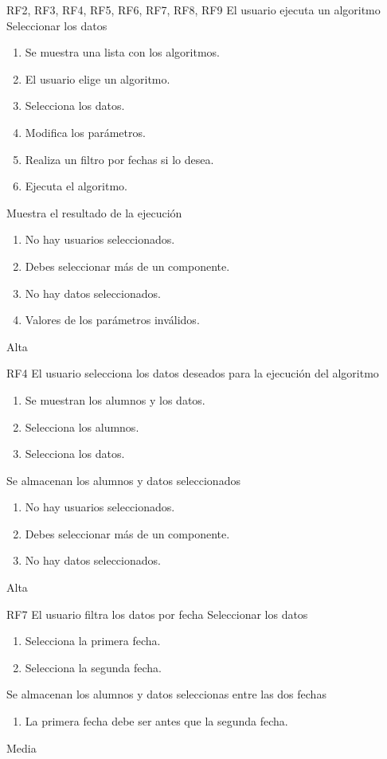 {RF2, RF3, RF4, RF5, RF6, RF7, RF8, RF9}
{El usuario ejecuta un algoritmo}
{Seleccionar los datos}
{
    \begin{enumerate}
        \def\labelenumi{\arabic{enumi}.}
        \tightlist
        \item Se muestra una lista con los algoritmos.
        \item El usuario elige un algoritmo.
        \item Selecciona los datos.
        \item Modifica los parámetros.
        \item Realiza un filtro por fechas si lo desea.
        \item Ejecuta el algoritmo.
    \end{enumerate}
}
{Muestra el resultado de la ejecución}
{
    \begin{enumerate}
        \def\labelenumi{\arabic{enumi}.}
        \tightlist
        \item No hay usuarios seleccionados.
        \item Debes seleccionar más de un componente.
        \item No hay datos seleccionados.
        \item Valores de los parámetros inválidos.
    \end{enumerate}
}
{Alta}

{RF4}
{El usuario selecciona los datos deseados para la ejecución del algoritmo}
{}
{
    \begin{enumerate}
        \def\labelenumi{\arabic{enumi}.}
        \tightlist
        \item Se muestran los alumnos y los datos.
        \item Selecciona los alumnos.
        \item Selecciona los datos.
    \end{enumerate}
}
{Se almacenan los alumnos y datos seleccionados}
{
    \begin{enumerate}
        \def\labelenumi{\arabic{enumi}.}
        \tightlist
        \item No hay usuarios seleccionados.
        \item Debes seleccionar más de un componente.
        \item No hay datos seleccionados.
    \end{enumerate}
}
{Alta}

{RF7}
{El usuario filtra los datos por fecha}
{Seleccionar los datos}
{
    \begin{enumerate}
        \def\labelenumi{\arabic{enumi}.}
        \tightlist
        \item Selecciona la primera fecha.
        \item Selecciona la segunda fecha.
    \end{enumerate}
}
{Se almacenan los alumnos y datos seleccionas entre las dos fechas}
{
    \begin{enumerate}
        \def\labelenumi{\arabic{enumi}.}
        \tightlist
        \item La primera fecha debe ser antes que la segunda fecha.
    \end{enumerate}
}
{Media}

